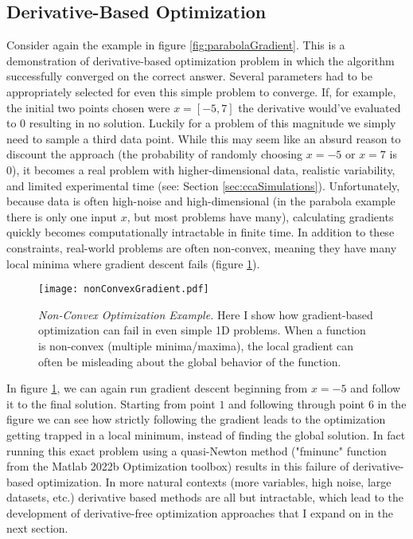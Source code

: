 \subsection{Derivative-Based Optimization}
\label{sec:DerivB}
Consider again the example in figure \ref{fig:parabolaGradient}. This is a demonstration of derivative-based optimization problem in which the algorithm successfully converged on the correct answer. Several parameters had to be appropriately selected for even this simple problem to converge. If, for example, the initial two points chosen were $x=[-5, 7]$ the derivative would've evaluated to $0$ resulting in no solution. Luckily for a problem of this magnitude we simply need to sample a third data point. While this may seem like an absurd reason to discount the approach (the probability of randomly choosing $x=-5$ or $x=7$ is 0), it becomes a real problem with higher-dimensional data, realistic variability, and limited experimental time (see: Section \ref{sec:ccaSimulations}). Unfortunately, because data is often high-noise and high-dimensional (in the parabola example there is only one input $x$, but most problems have many), calculating gradients quickly becomes computationally intractable in finite time. In addition to these constraints, real-world problems are often non-convex, meaning they have many local minima where gradient descent fails (figure \ref{fig:nonConvexGradient}). 

	\begin{figure}[h]
		\centering
		\texttt{[image: nonConvexGradient.pdf]} 
		{\caption{{\it Non-Convex Optimization Example.} Here I show how gradient-based optimization can fail in even simple 1D problems. When a function is non-convex (multiple minima/maxima), the local gradient can often be misleading about the global behavior of the function.}
		\label{fig:nonConvexGradient}}
	\end{figure}

In figure \ref{fig:nonConvexGradient}, we can again run gradient descent beginning from $x=-5$ and follow it to the final solution. Starting from point $1$ and following through point $6$ in the figure we can see how strictly following the gradient leads to the optimization getting trapped in a local minimum, instead of finding the global solution. In fact running this exact problem using a quasi-Newton method ("fminunc" function from the Matlab 2022b Optimization toolbox) results in this failure of derivative-based optimization. In more natural contexts (more variables, high noise, large datasets, etc.) derivative based methods are all but intractable, which lead to the development of derivative-free optimization approaches that I expand on in the next section.

